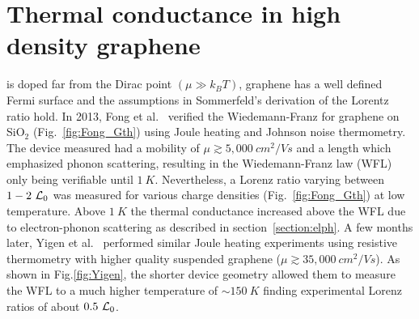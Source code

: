 \chapter{Thermal conductance in high density graphene}
\label{ch:thermal_conductance_in_high_density_graphene}
 is doped far from the Dirac point $(\mu\gg k_BT)$, graphene has a well defined Fermi surface and the assumptions in Sommerfeld's derivation of the Lorentz ratio hold. In 2013, Fong et al.~\cite{fong_measurement_2013} verified the Wiedemann-Franz for graphene on SiO$_2$ (Fig.~\ref{fig:Fong_Gth}) using Joule heating and Johnson noise thermometry. The device measured had a mobility of $\mu \gtrsim 5,000~cm^2/Vs$ and a length which emphasized phonon scattering, resulting in the Wiedemann-Franz law (WFL) only being verifiable until $1~K$. Nevertheless, a Lorenz ratio varying between $1-2~\mathcal{L}_0$ was measured for various charge densities (Fig.~\ref{fig:Fong_Gth}) at low temperature. Above $1~K$ the thermal conductance increased above the WFL due to electron-phonon scattering as described in section~\ref{section:elph}. A few months later, Yigen et al.~\cite{yigen_wiedemannfranz_2014} performed similar Joule heating experiments using resistive thermometry with higher quality suspended graphene ($\mu \gtrsim 35,000~cm^2/Vs$). As shown in Fig.\ref{fig:Yigen}, the shorter device geometry allowed them to measure the WFL to a much higher temperature of ${\sim}150~K$ finding experimental Lorenz ratios of about $0.5~\mathcal{L}_0$.
